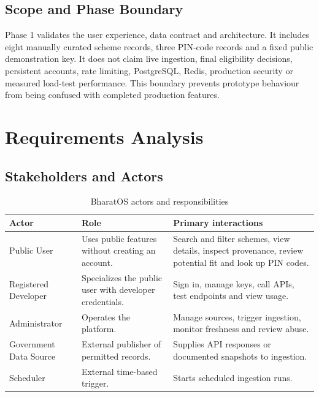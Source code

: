 \documentclass{tietreport}
\begin{document}
\section{Scope and Phase Boundary}
Phase 1 validates the user experience, data contract and architecture. It includes eight
manually curated scheme records, three PIN-code records and a fixed public demonstration key.
It does not claim live ingestion, final eligibility decisions, persistent accounts, rate
limiting, PostgreSQL, Redis, production security or measured load-test performance. This
boundary prevents prototype behaviour from being confused with completed production features.

\chapter{Requirements Analysis}

\section{Stakeholders and Actors}
\begin{table}[H]
\centering
\begin{tabularx}{\textwidth}{@{}lXX@{}}
\toprule
\textbf{Actor} & \textbf{Role} & \textbf{Primary interactions} \\
\midrule
Public User & Uses public features without creating an account. & Search and filter schemes,
view details, inspect provenance, review potential fit and look up PIN codes. \\
Registered Developer & Specializes the public user with developer credentials. & Sign in,
manage keys, call APIs, test endpoints and view usage. \\
Administrator & Operates the platform. & Manage sources, trigger ingestion, monitor freshness
and review abuse. \\
Government Data Source & External publisher of permitted records. & Supplies API responses or
documented snapshots to ingestion. \\
Scheduler & External time-based trigger. & Starts scheduled ingestion runs. \\
\bottomrule
\end{tabularx}
\caption{BharatOS actors and responsibilities}
\label{tab:actors}
\end{table}
\end{document}
